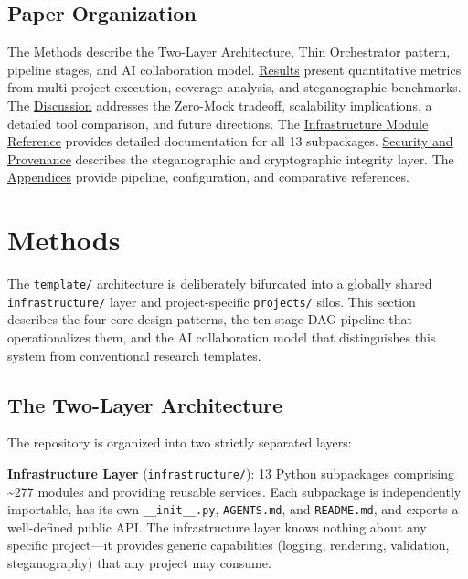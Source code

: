 \documentclass[
]{article}
\begin{document}
\subsection{Paper Organization}\label{paper-organization}

The \href{03a_architecture.md\#methods}{Methods} describe the Two-Layer
Architecture, Thin Orchestrator pattern, pipeline stages, and AI
collaboration model. \href{04_results.md\#results}{Results} present
quantitative metrics from multi-project execution, coverage analysis,
and steganographic benchmarks. The
\href{05a_zeromock_tradeoff.md\#the-zero-mock-tradeoff}{Discussion}
addresses the Zero-Mock tradeoff, scalability implications, a detailed
tool comparison, and future directions. The
\href{06_infrastructure_modules.md\#infrastructure-module-reference}{Infrastructure
Module Reference} provides detailed documentation for all 13
subpackages.
\href{07_security_provenance.md\#security-and-provenance}{Security and
Provenance} describes the steganographic and cryptographic integrity
layer. The
\href{08a_appendix_pipeline.md\#appendix-pipeline}{Appendices} provide
pipeline, configuration, and comparative references.

\newpage

\section{Methods}\label{methods}

The \texttt{template/} architecture is deliberately bifurcated into a
globally shared \texttt{infrastructure/} layer and project-specific
\texttt{projects/} silos. This section describes the four core design
patterns, the ten-stage DAG pipeline that operationalizes them, and the
AI collaboration model that distinguishes this system from conventional
research templates.

\subsection{The Two-Layer
Architecture}\label{the-two-layer-architecture}

The repository is organized into two strictly separated layers:

\textbf{Infrastructure Layer} (\texttt{infrastructure/}): 13 Python
subpackages comprising \textasciitilde277 modules and providing reusable
services. Each subpackage is independently importable, has its own
\texttt{\_\_init\_\_.py}, \texttt{AGENTS.md}, and \texttt{README.md},
and exports a well-defined public API. The infrastructure layer knows
nothing about any specific project---it provides generic capabilities
(logging, rendering, validation, steganography) that any project may
consume.
\end{document}
